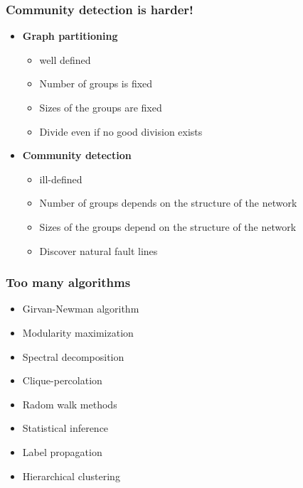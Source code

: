 \documentclass{beamer}
\begin{document}
\begin{frame}
    \frametitle{Community detection is harder!}
    \begin{itemize}
        \setlength\itemsep{2em}
        \item{{\bf Graph partitioning}
        \begin{itemize}
        \setlength\itemsep{0.5em}
            \item{\small well defined}
            \item{\small Number of groups is fixed}
            \item{\small Sizes of the groups are fixed}
            \item{\small Divide even if no good division exists}
        \end{itemize}
        }
        \item{{\bf Community detection}
        \begin{itemize}
        \setlength\itemsep{0.5em}
            \item{ill-defined}
            \item{\small Number of groups depends on the structure of the network}
            \item{\small Sizes of the groups depend on the structure of the network}
            \item{\small Discover natural fault lines}
        \end{itemize}
        }
    \end{itemize}
\end{frame}
\begin{frame}
    \frametitle{Too many algorithms}
    \centering
    \begin{itemize}
    \setlength\itemsep{1em}
        \item{Girvan-Newman algorithm}
        \item{Modularity maximization}
        \item{Spectral decomposition}
        \item{Clique-percolation}
        \item{Radom walk methods}
        \item{Statistical inference}
        \item{Label propagation}
        \item{Hierarchical clustering}
    \end{itemize}
\end{frame}
\end{document}
